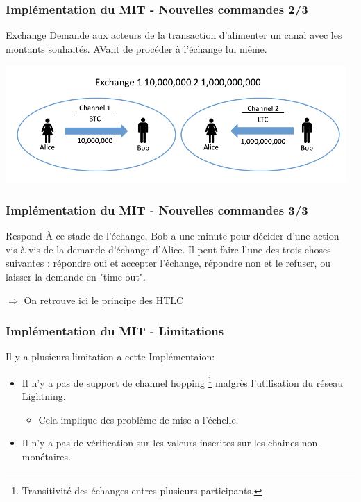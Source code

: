 \begin{frame}
  \frametitle{Implémentation du MIT - Nouvelles commandes 2/3}
  \begin{block}{Exchange}
Demande aux acteurs de la transaction d'alimenter un canal avec les montants souhaités. AVant de procéder à l'échange lui même.  
\end{block}
  \centering
  \includegraphics[scale = 0.6]{decentralisation/exchange.png}

\end{frame}

\begin{frame}
  \frametitle{Implémentation du MIT - Nouvelles commandes 3/3}
  \begin{block}{Respond}
    À ce stade de l'échange, Bob a une minute pour décider d'une action vis-à-vis de la demande d’échange d’Alice. Il peut faire l’une des trois choses suivantes : répondre oui et accepter l’échange, répondre non et le refuser, ou laisser la demande en "time out".  
  \end{block}
  $\Rightarrow$ On retrouve ici le principe des HTLC
\end{frame}

\begin{frame}
  \frametitle{Implémentation du MIT - Limitations}
  
  Il y a plusieurs limitation a cette Implémentaion:
  \newline
  \begin{itemize}
    \item Il n'y a pas de support de channel hopping \footnote{Transitivité des échanges entres plusieurs participants.} malgrès l'utilisation du réseau Lightning.
    \begin{itemize}
      \item Cela implique des problème de mise a l'échelle.
    \end{itemize}
    \item Il n'y a pas de vérification sur les valeurs inscrites sur les chaines non monétaires.
  \end{itemize}
\end{frame}
